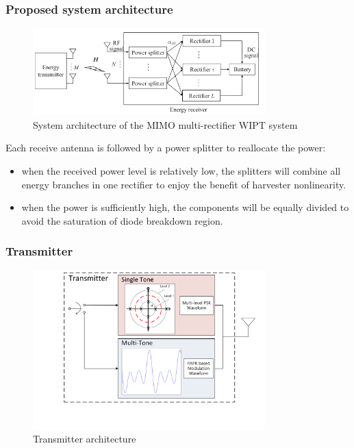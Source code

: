 \documentclass{beamer}
\begin{document}
\begin{frame}
\frametitle{Proposed system architecture}

\begin{figure}
  \centering
    \includegraphics[width=0.8\textwidth]{system_architecture}
  \caption{System architecture of the MIMO multi-rectifier WIPT system \cite{Ma2019}}
  \label{fig:system_architecture}
\end{figure}

Each receive antenna is followed by a power splitter to reallocate the power:

\begin{itemize}
  \item when the received power level is relatively low, the splitters will combine all energy branches in one rectifier to enjoy the benefit of harvester nonlinearity.
  \item when the power is sufficiently high, the components will be equally divided to avoid the saturation of diode breakdown region.
\end{itemize}

\end{frame}


\begin{frame}
\frametitle{Transmitter}

\begin{figure}
  \centering
    \includegraphics[width=0.8\textwidth]{transmitter}
  \caption{Transmitter architecture \cite{Park2018}}
  \label{fig:transmitter}
\end{figure}

\end{frame}
\end{document}
